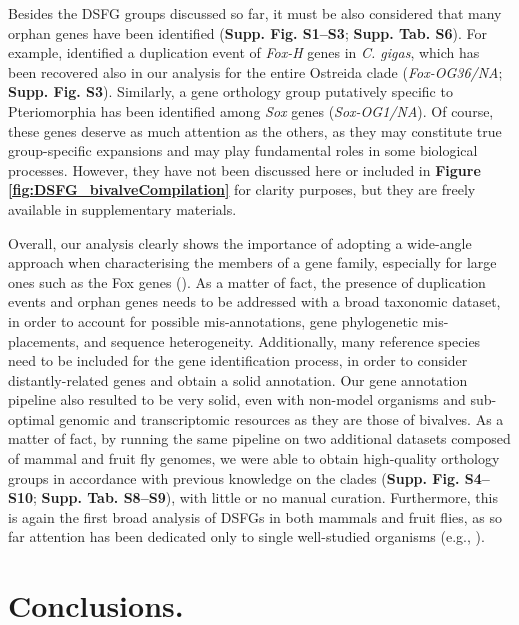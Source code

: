 \documentclass[../main.tex]{subfiles}
\begin{document}
Besides the DSFG groups discussed so far, it must be also considered that many orphan genes have been identified (\textbf{Supp. Fig. S1--S3}; \textbf{Supp. Tab. S6}). For example, \textbf{\cite{wu2020identification}} identified a duplication event of \textit{Fox-H} genes in \textit{C. gigas}, which has been recovered also in our analysis for the entire Ostreida clade (\textit{Fox-OG36/NA}; \textbf{Supp. Fig. S3}). Similarly, a gene orthology group putatively specific to Pteriomorphia has been identified among \textit{Sox} genes (\textit{Sox-OG1/NA}). Of course, these genes deserve as much attention as the others, as they may constitute true group-specific expansions and may play fundamental roles in some biological processes. However, they have not been discussed here or included in \textbf{Figure \ref{fig:DSFG_bivalveCompilation}} for clarity purposes, but they are freely available in supplementary materials.

Overall, our analysis clearly shows the importance of adopting a wide-angle approach when characterising the members of a gene family, especially for large ones such as the Fox genes (\textbf{\cite{schomburg2022phylogenetic}}). As a matter of fact, the presence of duplication events and orphan genes needs to be addressed with a broad taxonomic dataset, in order to account for possible mis-annotations, gene phylogenetic mis-placements, and sequence heterogeneity. Additionally, many reference species need to be included for the gene identification process, in order to consider distantly-related genes and obtain a solid annotation. Our gene annotation pipeline also resulted to be very solid, even with non-model organisms and sub-optimal genomic and transcriptomic resources as they are those of bivalves. As a matter of fact, by running the same pipeline on two additional datasets composed of mammal and fruit fly genomes, we were able to obtain high-quality orthology groups in accordance with previous knowledge on the clades (\textbf{Supp. Fig. S4--S10}; \textbf{Supp. Tab. S8--S9}), with little or no manual curation. Furthermore, this is again the first broad analysis of DSFGs in both mammals and fruit flies, as so far attention has been dedicated only to single well-studied organisms (e.g., \textbf{\cite{jackson2010update}}).

\section{Conclusions.} \label{chapter3_conclusions}
\end{document}
